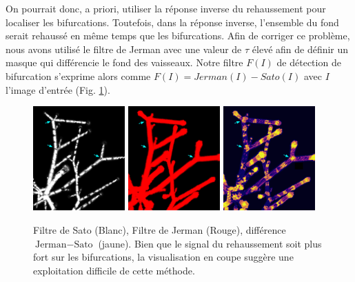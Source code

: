On pourrait donc, a priori, utiliser la réponse inverse du rehaussement pour localiser les bifurcations. Toutefois, dans la réponse inverse, l'ensemble du fond serait rehaussé en même temps que les bifurcations. Afin de corriger ce problème, nous avons utilisé le filtre de Jerman avec une valeur de $\tau$ élevé afin de définir un masque qui différencie le fond des vaisseaux. Notre filtre $F(I)$ de détection de bifurcation s'exprime alors comme $F(I) = Jerman(I) - Sato(I)$ avec $I$ l'image d'entrée (Fig. \ref{fig:subtract_vesselness}). 
\begin{figure}[!ht]
    \centering
    \includegraphics[height=4cm]{Images/SatoFilter_bif.png}
    \includegraphics[height=4cm]{Images/JermanFilter_bif.png}
    \includegraphics[height=4cm]{Images/subJermanSato_bif.png}
    \caption{Filtre de Sato (Blanc), Filtre de Jerman (Rouge), différence $\textrm{Jerman}-\textrm{Sato}$ (jaune). Bien que le signal du rehaussement soit plus fort sur les bifurcations, la visualisation en coupe suggère une exploitation difficile de cette méthode.}
    \label{fig:subtract_vesselness}
\end{figure}


